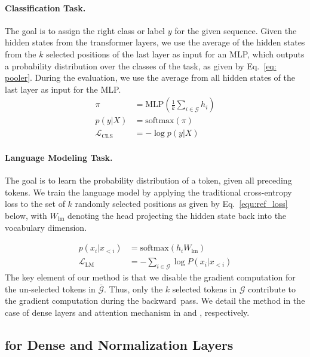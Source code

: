 \paragraph{Classification Task.} 
The goal is to assign the right class or label $y$ for the given sequence.
Given the hidden states from the transformer layers,
we use the average of the hidden states from the $k$ selected positions of the last layer as input for an MLP,
which outputs a probability distribution over the classes of the task, as given by Eq.~\ref{eq: pooler}. 
During the evaluation, we use the average from all hidden states of the last layer as input for the MLP.
\begin{equation}
\begin{split}
    \pi &= \text{MLP}\left(\frac{1}{k}\sum_{i \in \mathcal{G}}h_{i}\right)\\
    p(y | X) &= \text{softmax}(\pi) \\
    \mathcal{L}_{\text{CLS}} &= -\log p(y | X)
\end{split}
  \label{eq: pooler}
\end{equation}

\paragraph{Language Modeling Task.} 
The goal is to learn the probability distribution of a token, given all preceding tokens.
We train the language model  by applying the traditional cross-entropy loss to the set of $k$ randomly selected positions as given by Eq.~\ref{equ:ref_loss} below, with $W_{\text{lm}}$ denoting the head projecting the hidden state back into the vocabulary dimension.

\begin{equation}
\begin{split}
p(x_i | x_{<i}) &= \text{softmax}(h_{i} W_{\text{lm}} ) \\
\mathcal{L}_{\text{LM}} &= -\sum_{i \in \mathcal{G}} \log P(x_i | x_{<i})
\end{split}
\label{equ:ref_loss}
\end{equation}
The key element of our method is that we disable the gradient computation for the un-selected tokens in $\bar{\mathcal{G}}$. 
Thus, only the $k$ selected tokens in $\mathcal{G}$ contribute to the gradient computation during the backward~pass. We detail the method in the case of dense layers and attention mechanism in  and , respectively.

\subsection{\method for Dense and Normalization Layers}
\label{method:dense}


